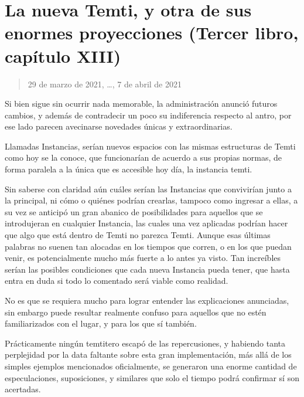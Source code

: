 \documentclass[
  spanish,
]{book}
\begin{document}
\hypertarget{la-nueva-temti-y-otra-de-sus-enormes-proyecciones-tercer-libro-capuxedtulo-xiii}{%
\section{La nueva Temti, y otra de sus enormes proyecciones (Tercer libro, capítulo XIII)}\label{la-nueva-temti-y-otra-de-sus-enormes-proyecciones-tercer-libro-capuxedtulo-xiii}}

\begin{quote}
29 de marzo de 2021, \ldots, 7 de abril de 2021
\end{quote}

Si bien sigue sin ocurrir nada memorable, la administración anunció futuros cambios, y además de contradecir un poco su indiferencia respecto al antro, por ese lado parecen avecinarse novedades únicas y extraordinarias.

Llamadas Instancias, serían nuevos espacios con las mismas estructuras de Temti como hoy se la conoce, que funcionarían de acuerdo a sus propias normas, de forma paralela a la única que es accesible hoy día, la instancia temti.

Sin saberse con claridad aún cuáles serían las Instancias que convivirían junto a la principal, ni cómo o quiénes podrían crearlas, tampoco como ingresar a ellas, a su vez se anticipó un gran abanico de posibilidades para aquellos que se introdujeran en cualquier Instancia, las cuales una vez aplicadas podrían hacer que algo que está dentro de Temti no parezca Temti. Aunque esas últimas palabras no suenen tan alocadas en los tiempos que corren, o en los que puedan venir, es potencialmente mucho más fuerte a lo antes ya visto. Tan increíbles serían las posibles condiciones que cada nueva Instancia pueda tener, que hasta entra en duda si todo lo comentado será viable como realidad.

No es que se requiera mucho para lograr entender las explicaciones anunciadas, sin embargo puede resultar realmente confuso para aquellos que no estén familiarizados con el lugar, y para los que sí también.

Prácticamente ningún temtitero escapó de las repercusiones, y habiendo tanta perplejidad por la data faltante sobre esta gran implementación, más allá de los simples ejemplos mencionados oficialmente, se generaron una enorme cantidad de especulaciones, suposiciones, y similares que solo el tiempo podrá confirmar sí son acertadas.
\end{document}
